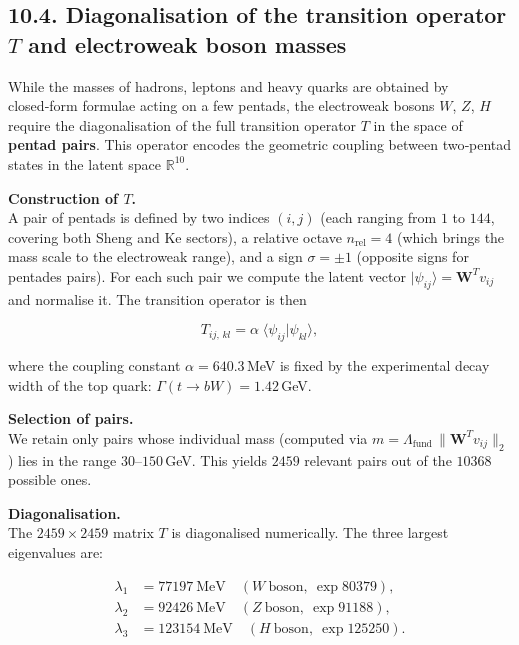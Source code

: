\documentclass[11pt]{article}
\begin{document}
\hypertarget{diagonalisation-of-the-transition-operator-t-and-electroweak-boson-masses}{%
\subsection{\texorpdfstring{10.4. Diagonalisation of the transition
operator \(T\) and electroweak boson
masses}{10.4. Diagonalisation of the transition operator T and electroweak boson masses}}\label{diagonalisation-of-the-transition-operator-t-and-electroweak-boson-masses}}

While the masses of hadrons, leptons and heavy quarks are obtained by
closed‑form formulae acting on a few pentads, the electroweak bosons
\(W\), \(Z\), \(H\) require the diagonalisation of the full transition
operator \(T\) in the space of \textbf{pentad pairs}. This operator
encodes the geometric coupling between two‑pentad states in the latent
space \(\mathbb{R}^{10}\).

\textbf{Construction of \(T\).}\\
A pair of pentads is defined by two indices \((i,j)\) (each ranging from
\(1\) to \(144\), covering both Sheng and Ke sectors), a relative octave
\(n_{\text{rel}}=4\) (which brings the mass scale to the electroweak
range), and a sign \(\sigma = \pm 1\) (opposite signs for pentades
pairs). For each such pair we compute the latent vector
\(|\psi_{ij}\rangle = \mathbf{W}^T v_{ij}\) and normalise it. The
transition operator is then

\[
T_{ij,\,kl} = \alpha \; \langle\psi_{ij}|\psi_{kl}\rangle,
\]

where the coupling constant \(\alpha = 640.3\)\,MeV is fixed by the
experimental decay width of the top quark:
\(\Gamma(t\to bW)=1.42\)\,GeV.

\textbf{Selection of pairs.}\\
We retain only pairs whose individual mass (computed via
\(m = \Lambda_{\text{fund}}\,\| \mathbf{W}^T v_{ij}\|_2\)) lies in the
range \(30\)--\(150\)\,GeV. This yields \(2459\) relevant pairs out of
the \(10368\) possible ones.

\textbf{Diagonalisation.}\\
The \(2459\times 2459\) matrix \(T\) is diagonalised numerically. The
three largest eigenvalues are:

\[
\begin{aligned}
\lambda_1 &= 77197\ \text{MeV} \quad (W\ \text{boson},\ \exp 80379),\\
\lambda_2 &= 92426\ \text{MeV} \quad (Z\ \text{boson},\ \exp 91188),\\
\lambda_3 &= 123154\ \text{MeV} \quad (H\ \text{boson},\ \exp 125250).
\end{aligned}
\]
\end{document}
